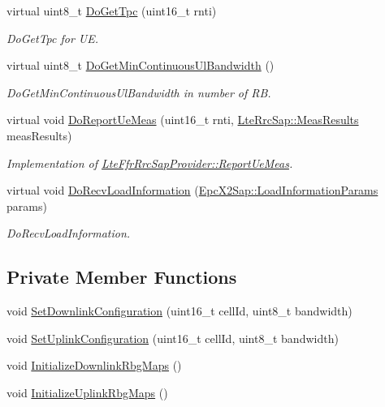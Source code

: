 \begin{DoxyCompactItemize}
virtual uint8\+\_\+t \hyperlink{classns3_1_1LteFrHardAlgorithm_a5e8b4fe9878c16106a85d744608ae673}{Do\+Get\+Tpc} (uint16\+\_\+t rnti)
\begin{DoxyCompactList}\small\item\em Do\+Get\+Tpc for UE. \end{DoxyCompactList}\item 
virtual uint8\+\_\+t \hyperlink{classns3_1_1LteFrHardAlgorithm_adfd4fa13fd617b8e2a82a2ec66163479}{Do\+Get\+Min\+Continuous\+Ul\+Bandwidth} ()
\begin{DoxyCompactList}\small\item\em Do\+Get\+Min\+Continuous\+Ul\+Bandwidth in number of RB. \end{DoxyCompactList}\item 
virtual void \hyperlink{classns3_1_1LteFrHardAlgorithm_ab0df4e5ed62e143d7cbcd4a69bba4013}{Do\+Report\+Ue\+Meas} (uint16\+\_\+t rnti, \hyperlink{structns3_1_1LteRrcSap_1_1MeasResults}{Lte\+Rrc\+Sap\+::\+Meas\+Results} meas\+Results)
\begin{DoxyCompactList}\small\item\em Implementation of \hyperlink{classns3_1_1LteFfrRrcSapProvider_aefa0779641b8432a7d3406b519ca7e59}{Lte\+Ffr\+Rrc\+Sap\+Provider\+::\+Report\+Ue\+Meas}. \end{DoxyCompactList}\item 
virtual void \hyperlink{classns3_1_1LteFrHardAlgorithm_ac5666f1063069509319f758d51ecbf8c}{Do\+Recv\+Load\+Information} (\hyperlink{structns3_1_1EpcX2Sap_1_1LoadInformationParams}{Epc\+X2\+Sap\+::\+Load\+Information\+Params} params)
\begin{DoxyCompactList}\small\item\em Do\+Recv\+Load\+Information. \end{DoxyCompactList}\end{DoxyCompactItemize}
\subsection*{Private Member Functions}
\begin{DoxyCompactItemize}
\item 
void \hyperlink{classns3_1_1LteFrHardAlgorithm_a03585d1a4f4c9c0f407db34abf9a9e26}{Set\+Downlink\+Configuration} (uint16\+\_\+t cell\+Id, uint8\+\_\+t bandwidth)
\item 
void \hyperlink{classns3_1_1LteFrHardAlgorithm_a590970a1c888bfc9b95fd38909a8a470}{Set\+Uplink\+Configuration} (uint16\+\_\+t cell\+Id, uint8\+\_\+t bandwidth)
\item 
void \hyperlink{classns3_1_1LteFrHardAlgorithm_a180ac2d78861eca2bd6bf6bd00a7e56e}{Initialize\+Downlink\+Rbg\+Maps} ()
\item 
void \hyperlink{classns3_1_1LteFrHardAlgorithm_a1e9611ec3b54a0af073ed1ea2993f2fd}{Initialize\+Uplink\+Rbg\+Maps} ()
\end{DoxyCompactItemize}
